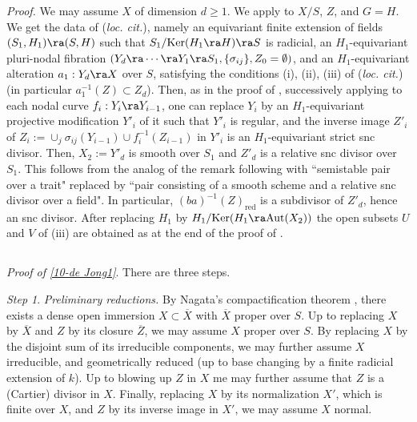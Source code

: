 \documentclass[10pt]{../fichiers-configuration-latex/smfart}
\begin{document}
\textit{Proof.} We may assume $X$ of dimension $d \ge 1$. We apply
\cite[4.4.3]{BS@Vidal} to $X/S$, $Z$, and $G = H$. We get the data of
(\textit{loc. cit.}), namely an equivariant finite extension of fields
$(S_1, H_1) \ra (S,H)$ such that $S_1/\mathrm{Ker}(H_1 \ra H) \ra S$ is
radicial, an $H_1$-equivariant pluri-nodal fibration $(Y_d \ra \cdots \ra
Y_1 \ra S_1, \{ \sigma_{ij} \}, Z_0 = \emptyset)$, and an $H_1$-equivariant
alteration $a_1 : Y_d \ra X$ over $S$, satisfying the conditions (i),
(ii), (iii) of (\textit{loc. cit.}) (in particular $a_1^{-1}(Z) \subset
Z_d$). Then, as in the proof of \cite[4.4.1]{BS@Vidal}, successively applying
\cite[4.4.4]{BS@Vidal} to each nodal curve $f_i : Y_i \ra Y_{i-1}$, one can
replace $Y_i$ by an $H_1$-equivariant projective modification $Y'_i$ of it
such that $Y'_i$ is regular, and the inverse image $Z'_i$ of $Z_i := \cup_j
\sigma_{ij}(Y_{i-1}) \cup f_i^{-1}(Z_{i-1})$ in $Y'_i$ is an $H_1$-equivariant
strict snc divisor. Then,  $X_2 := Y'_d$ is smooth over $S_1$ and $Z'_d$
is a relative snc divisor over $S_1$. This follows from the analog of
the remark following \cite[4.4.4]{BS@Vidal} with ``semistable pair over
a trait" replaced by ``pair consisting of a smooth scheme and a relative
snc divisor over a field". In particular, $(ba)^{-1}(Z)_{\mathrm{red}}$
is a subdivisor of $Z'_d$, hence an snc divisor. After replacing $H_1$ by
$H_1/\mathrm{Ker}(H_1 \ra \mathrm{Aut}(X_2))$ the open subsets $U$ and $V$
of (iii) are obtained as at the end of the proof of \cite[4.4.1]{BS@Vidal}.

\subsection{}\label{10-proof of de Jong1} \textit{Proof of \ref{10-de
Jong1}}. There are three steps.

\medskip \textit{Step 1}. \textit{Preliminary reductions.} By Nagata's
compactification theorem \cite{Nagata@Conrad}, there exists a dense open
immersion $X \subset \overline{X}$ with $\overline{X}$ proper over $S$. Up
to replacing $X$ by $\overline{X}$ and $Z$ by its closure $\overline{Z}$,
we may assume $X$ proper over $S$. By replacing $X$ by the disjoint sum
of its irreducible components, we may further assume $X$ irreducible, and
geometrically reduced (up to base changing by a finite radicial extension
of $k$). Up to blowing up $Z$ in $X$ me may further assume that $Z$ is a
(Cartier) divisor in $X$. Finally, replacing $X$ by its normalization $X'$,
which is finite over $X$, and $Z$ by its inverse image in $X'$, we may assume
$X$ normal.
\end{document}
